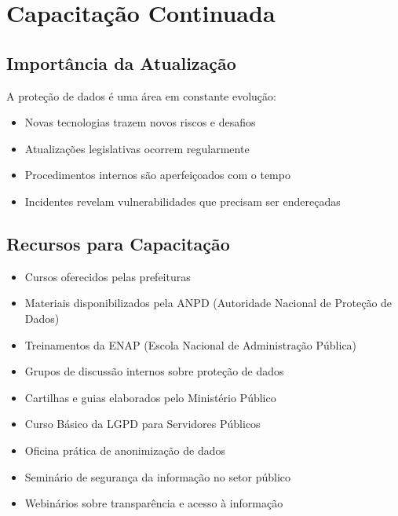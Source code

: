 \documentclass[12pt,a4paper]{article}
\begin{document}
\newpage
\section{Capacitação Continuada}

\subsection{Importância da Atualização}
A proteção de dados é uma área em constante evolução:
\begin{itemize}
    \item Novas tecnologias trazem novos riscos e desafios
    \item Atualizações legislativas ocorrem regularmente
    \item Procedimentos internos são aperfeiçoados com o tempo
    \item Incidentes revelam vulnerabilidades que precisam ser endereçadas
\end{itemize}

\subsection{Recursos para Capacitação}
\begin{itemize}
    \item Cursos oferecidos pelas prefeituras
    \item Materiais disponibilizados pela ANPD (Autoridade Nacional de Proteção de Dados)
    \item Treinamentos da ENAP (Escola Nacional de Administração Pública)
    \item Grupos de discussão internos sobre proteção de dados
    \item Cartilhas e guias elaborados pelo Ministério Público
\end{itemize}

\begin{tcolorbox}[colback=verdeclaro, colframe=green!75!black, title=Treinamentos Recomendados]
\begin{itemize}
    \item Curso Básico da LGPD para Servidores Públicos
    \item Oficina prática de anonimização de dados
    \item Seminário de segurança da informação no setor público
    \item Webinários sobre transparência e acesso à informação
\end{itemize}
\end{tcolorbox}
\end{document}
